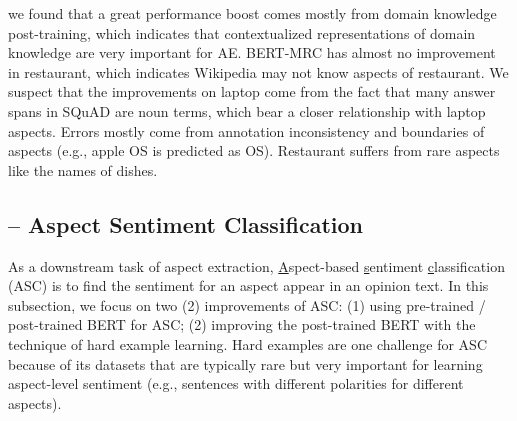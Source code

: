 \begin{table}[H]
    \centering
    \caption{BERT for AE in F1.}
\label{chap6:tbl:result_ae}
\vspace{-5mm}
\end{table}

we found that a great performance boost comes mostly from domain knowledge post-training, which indicates that contextualized representations of domain knowledge are very important for AE. BERT-MRC has almost no improvement in restaurant, which indicates Wikipedia may not know aspects of restaurant.
We suspect that the improvements on laptop come from the fact that many answer spans in SQuAD are noun terms, which bear a closer relationship with laptop aspects.
Errors mostly come from annotation inconsistency and boundaries of aspects (e.g., apple OS is predicted as OS). Restaurant suffers from rare aspects like the names of dishes.


\subsection{-- Aspect Sentiment Classification}

As a downstream task of aspect extraction, \underline{A}spect-based \underline{s}entiment \underline{c}lassification (ASC) is to find the sentiment for an aspect appear in an opinion text.
In this subsection, we focus on two (2) improvements of ASC: (1) using pre-trained / post-trained BERT for ASC; (2) improving the post-trained BERT with the technique of hard example learning.
Hard examples are one challenge for ASC because of its datasets that are typically rare but very important for learning aspect-level sentiment (e.g., sentences with different polarities for different aspects).

